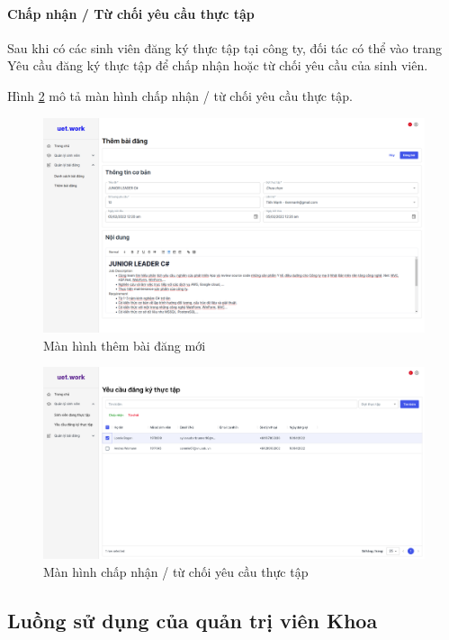 \documentclass[./../main.tex]{subfiles}
\begin{document}
\paragraph*{Chấp nhận / Từ chối yêu cầu thực tập}

Sau khi có các sinh viên đăng ký thực tập tại công ty, đối tác có thể vào trang Yêu cầu đăng ký thực tập để chấp nhận hoặc từ chối yêu cầu của sinh viên.

Hình \ref{fig:approve_or_reject_request} mô tả màn hình chấp nhận / từ chối yêu cầu thực tập.

\begin{figure}[]
	\includegraphics[width=\linewidth]{./images/image18.png}
	\caption{Màn hình thêm bài đăng mới}
	\label{fig:add_post_page}
\end{figure}

\begin{figure}[]
	\includegraphics[width=\linewidth]{./images/image29.png}
	\caption{Màn hình chấp nhận / từ chối yêu cầu thực tập }
	\label{fig:approve_or_reject_request}
\end{figure}

\subsection{Luồng sử dụng của quản trị viên Khoa}
\end{document}
